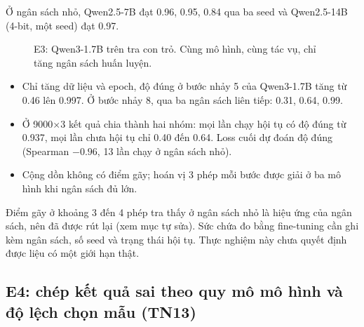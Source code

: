 \documentclass[11pt]{article}
\begin{document}
Ở ngân sách nhỏ, Qwen2.5-7B đạt 0.96, 0.95, 0.84 qua ba seed và Qwen2.5-14B (4-bit, một seed) đạt 0.97.

\begin{figure}[h]
\centering
{}
\caption{E3: Qwen3-1.7B trên tra con trỏ. Cùng mô hình, cùng tác vụ, chỉ tăng ngân sách huấn luyện.}
\end{figure}

\begin{cachdoc}
\begin{itemize}[leftmargin=*,itemsep=1pt]
\item Chỉ tăng dữ liệu và epoch, độ đúng ở bước nhảy 5 của Qwen3-1.7B tăng từ 0.46 lên 0.997. Ở bước nhảy 8,
  qua ba ngân sách liên tiếp: 0.31, 0.64, 0.99.
\item Ở 9000$\times$3 kết quả chia thành hai nhóm: mọi lần chạy hội tụ có độ đúng từ 0.937, mọi lần chưa hội
  tụ chỉ 0.40 đến 0.64. Loss cuối dự đoán độ đúng (Spearman $-0.96$, 13 lần chạy ở ngân sách nhỏ).
\item Cộng dồn không có điểm gãy; hoán vị 3 phép mỗi bước được giải ở ba mô hình khi ngân sách đủ lớn.
\end{itemize}
\end{cachdoc}

\begin{ketluan}
Điểm gãy ở khoảng 3 đến 4 phép tra thấy ở ngân sách nhỏ là hiệu ứng của ngân sách, nên đã được rút lại
(xem mục tự sửa). Sức chứa đo bằng fine-tuning cần ghi kèm ngân sách, số seed và trạng thái hội tụ. Thực
nghiệm này chưa quyết định được liệu có một giới hạn thật.
\end{ketluan}

\subsection{E4: chép kết quả sai theo quy mô mô hình và độ lệch chọn mẫu (TN13)}
\end{document}
